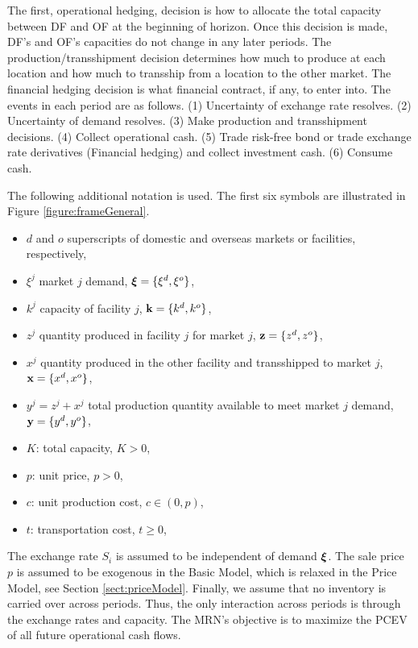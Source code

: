 \documentclass[mnsc,nonblindrev,copyedit]{informs2_wz} %
\newcommand{\xiv}{\mbox{\boldmath$\xi$}}
\begin{document}
The first, operational hedging, decision is how to allocate the total capacity between DF and OF at the beginning of horizon.  Once this decision is made, DF's and OF's capacities do not change in any later periods. The production/transshipment decision determines how much to produce at each location and how much to transship from a location to the other market. The financial hedging decision is what financial contract, if any, to enter into. The events in each period are as follows. (1) Uncertainty of exchange rate resolves. (2) Uncertainty of demand resolves. (3) Make production and transshipment decisions. (4) Collect operational cash. (5) Trade risk-free bond or trade exchange rate derivatives (Financial hedging) and collect investment cash. (6) Consume cash.

The following additional notation is used.  The first six symbols are illustrated in Figure \ref{figure:frameGeneral}.
\begin{itemize}
    \item $d$ and $o$ superscripts of domestic and overseas markets or facilities, respectively,
    \item $\xi^j$ market $j$ demand, ${\xiv} = \{\xi^d, \xi^o \} $,
    \item $k^j$ capacity of facility $j$,   $\bold k = \{k^d,k^o\}$,
    \item $z^{j}$ quantity produced in facility $j$ for market $j$, $\bold z = \{z^{d},z^o\}$,
    \item $x^{j}$ quantity produced in the other facility and transshipped to market $j$, $\bold x = \{x^d,x^o\}$,
    \item $y^{j}= z^j + x^j$ total production quantity available to meet market $j$ demand, $\bold y = \{y^d,y^o\}$,



    \item $K$: total capacity, $K >0$,
    \item $p$: unit price, $p > 0$,
    \item $c$: unit production cost, $c \in (0, p)$,
    \item $t$: transportation cost, $t\geq 0$,
\end{itemize}
The exchange rate $S_i$ is assumed to be independent of demand $\xiv$. The sale price $p$ is assumed to be exogenous in the Basic Model, which is relaxed in the Price Model, see Section \ref{sect:priceModel}. Finally, we assume that no inventory is carried over across periods.  Thus, the only interaction across periods is through the exchange rates and capacity. The MRN's objective is to maximize the PCEV of all future operational cash flows.
\end{document}
